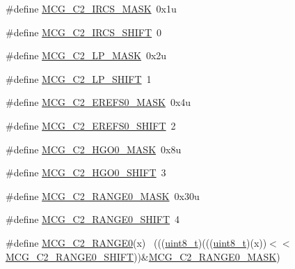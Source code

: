 \begin{DoxyCompactItemize}
\item 
\#define \hyperlink{group___m_c_g___register___masks_gaef3ef9fc35df3b7d404dd2b7279051cb}{M\+C\+G\+\_\+\+C2\+\_\+\+I\+R\+C\+S\+\_\+\+M\+A\+SK}~0x1u
\item 
\#define \hyperlink{group___m_c_g___register___masks_ga9a364696151f81b7a671bafd25cf16d1}{M\+C\+G\+\_\+\+C2\+\_\+\+I\+R\+C\+S\+\_\+\+S\+H\+I\+FT}~0
\item 
\#define \hyperlink{group___m_c_g___register___masks_ga204f588f13f46a9ae20bc7aecfdf4f37}{M\+C\+G\+\_\+\+C2\+\_\+\+L\+P\+\_\+\+M\+A\+SK}~0x2u
\item 
\#define \hyperlink{group___m_c_g___register___masks_ga2c16a5396267a83c2059741d31c3af1a}{M\+C\+G\+\_\+\+C2\+\_\+\+L\+P\+\_\+\+S\+H\+I\+FT}~1
\item 
\#define \hyperlink{group___m_c_g___register___masks_gae9a32b79976c185a9b6567cc74b2d5af}{M\+C\+G\+\_\+\+C2\+\_\+\+E\+R\+E\+F\+S0\+\_\+\+M\+A\+SK}~0x4u
\item 
\#define \hyperlink{group___m_c_g___register___masks_ga1cea960436deb685a7f131203e4898b5}{M\+C\+G\+\_\+\+C2\+\_\+\+E\+R\+E\+F\+S0\+\_\+\+S\+H\+I\+FT}~2
\item 
\#define \hyperlink{group___m_c_g___register___masks_ga58de06b4d4514888ca2e7cbc68e50ccc}{M\+C\+G\+\_\+\+C2\+\_\+\+H\+G\+O0\+\_\+\+M\+A\+SK}~0x8u
\item 
\#define \hyperlink{group___m_c_g___register___masks_ga881979b382aef0029c4e4990e365d8f5}{M\+C\+G\+\_\+\+C2\+\_\+\+H\+G\+O0\+\_\+\+S\+H\+I\+FT}~3
\item 
\#define \hyperlink{group___m_c_g___register___masks_ga5436f4e93034d8536c23eabcac1b1a43}{M\+C\+G\+\_\+\+C2\+\_\+\+R\+A\+N\+G\+E0\+\_\+\+M\+A\+SK}~0x30u
\item 
\#define \hyperlink{group___m_c_g___register___masks_gaca9dfaea66978e556c7a9773e2c8c531}{M\+C\+G\+\_\+\+C2\+\_\+\+R\+A\+N\+G\+E0\+\_\+\+S\+H\+I\+FT}~4
\item 
\#define \hyperlink{group___m_c_g___register___masks_ga41d54c406df1619eeea11097d619c6a7}{M\+C\+G\+\_\+\+C2\+\_\+\+R\+A\+N\+G\+E0}(x)                                              ~(((\hyperlink{_p_e___types_8h_aba7bc1797add20fe3efdf37ced1182c5}{uint8\+\_\+t})(((\hyperlink{_p_e___types_8h_aba7bc1797add20fe3efdf37ced1182c5}{uint8\+\_\+t})(x))$<$$<$\hyperlink{group___m_c_g___register___masks_gaca9dfaea66978e556c7a9773e2c8c531}{M\+C\+G\+\_\+\+C2\+\_\+\+R\+A\+N\+G\+E0\+\_\+\+S\+H\+I\+FT}))\&\hyperlink{group___m_c_g___register___masks_ga5436f4e93034d8536c23eabcac1b1a43}{M\+C\+G\+\_\+\+C2\+\_\+\+R\+A\+N\+G\+E0\+\_\+\+M\+A\+SK})
$$
\end{DoxyCompactItemize}
